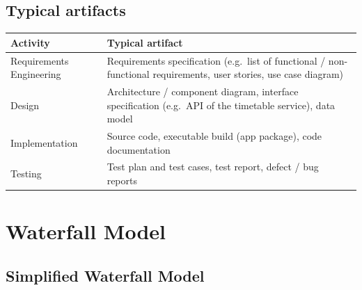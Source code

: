 \documentclass[11pt,a4paper]{article}
\begin{document}
\subsection*{Typical artifacts}

\begin{tabularx}{\textwidth}{@{}l L@{}}
\toprule
\textbf{Activity} & \textbf{Typical artifact} \\
\midrule
Requirements Engineering & Requirements specification (e.g.\ list of
  functional / non-functional requirements, user stories, use case diagram) \\
Design & Architecture / component diagram, interface specification
  (e.g.\ API of the timetable service), data model \\
Implementation & Source code, executable build (app package), code
  documentation \\
Testing & Test plan and test cases, test report, defect / bug reports \\
\bottomrule
\end{tabularx}

\section{Waterfall Model}

\subsection*{Simplified Waterfall Model}

\begin{center}
\end{center}
\end{document}

